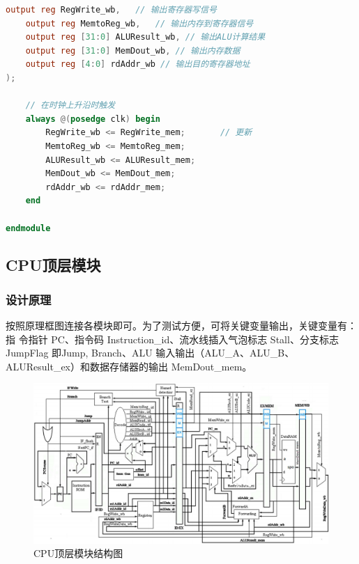 \documentclass[12pt,hyperref,a4paper,UTF8]{ctexart}
\begin{document}
\begin{lstlisting}[language=Verilog,caption=各级流水线寄存器]
    output reg RegWrite_wb,   // 输出寄存器写信号
    output reg MemtoReg_wb,   // 输出内存到寄存器信号
    output reg [31:0] ALUResult_wb, // 输出ALU计算结果
    output reg [31:0] MemDout_wb, // 输出内存数据
    output reg [4:0] rdAddr_wb // 输出目的寄存器地址
);

    // 在时钟上升沿时触发
    always @(posedge clk) begin
        RegWrite_wb <= RegWrite_mem;       // 更新
        MemtoReg_wb <= MemtoReg_mem;       
        ALUResult_wb <= ALUResult_mem;     
        MemDout_wb <= MemDout_mem;         
        rdAddr_wb <= rdAddr_mem;           
    end

endmodule
\end{lstlisting}


\newpage

\subsection{CPU顶层模块}
\subsubsection*{\Large 设计原理}
\normalsize

按照原理框图连接各模块即可。为了测试方便，可将关键变量输出，关键变量有：指
令指针 PC、指令码 Instruction\_id、流水线插入气泡标志 Stall、分支标志 JumpFlag 即{Jump, Branch}、ALU
输入输出（ALU\_A、ALU\_B、ALUResult\_ex）和数据存储器的输出 MemDout\_mem。

    \begin{figure}[H]
        \centering
        \includegraphics[width=1\textwidth]{figures/fig/image18.png}
        \caption{CPU顶层模块结构图}
    \end{figure}

\newpage
\end{document}
